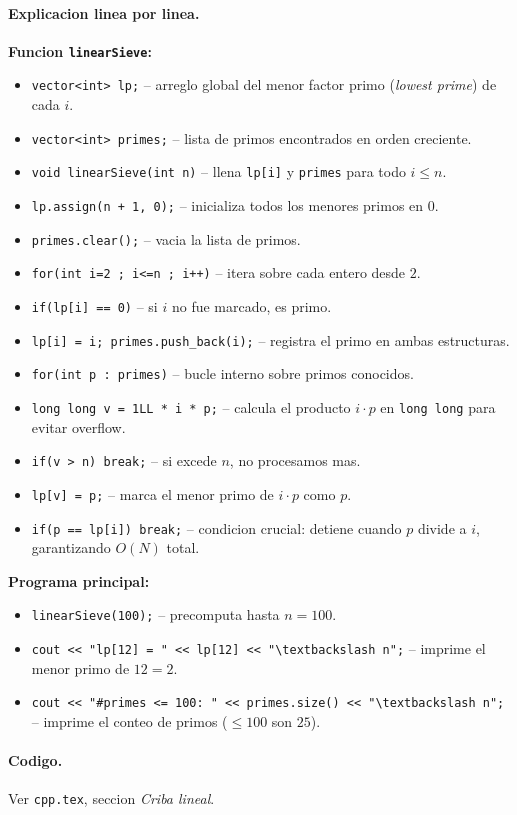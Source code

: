 \paragraph{Explicacion linea por linea.}
\textbf{Funcion \texttt{linearSieve}:}
\begin{itemize}\setlength\itemsep{0pt}
	\item \verb|vector<int> lp;| -- arreglo global del menor factor primo (\textit{lowest prime}) de cada $i$.
	\item \verb|vector<int> primes;| -- lista de primos encontrados en orden creciente.
	\item \verb|void linearSieve(int n)| -- llena \verb|lp[i]| y \texttt{primes} para todo $i \le n$.
	\item \verb|lp.assign(n + 1, 0);| -- inicializa todos los menores primos en $0$.
	\item \verb|primes.clear();| -- vacia la lista de primos.
	\item \verb|for(int i=2 ; i<=n ; i++)| -- itera sobre cada entero desde $2$.
	\item \verb|if(lp[i] == 0)| -- si $i$ no fue marcado, es primo.
	\item \verb|lp[i] = i; primes.push_back(i);| -- registra el primo en ambas estructuras.
	\item \verb|for(int p : primes)| -- bucle interno sobre primos conocidos.
	\item \verb|long long v = 1LL * i * p;| -- calcula el producto $i \cdot p$ en \verb|long long| para evitar overflow.
	\item \verb|if(v > n) break;| -- si excede $n$, no procesamos mas.
	\item \verb|lp[v] = p;| -- marca el menor primo de $i \cdot p$ como $p$.
	\item \verb|if(p == lp[i]) break;| -- condicion crucial: detiene cuando $p$ divide a $i$, garantizando $O(N)$ total.
\end{itemize}
\textbf{Programa principal:}
\begin{itemize}\setlength\itemsep{0pt}
	\item \verb|linearSieve(100);| -- precomputa hasta $n=100$.
	\item \verb|cout << "lp[12] = " << lp[12] << "\textbackslash n";| -- imprime el menor primo de $12 = 2$.
	\item \verb|cout << "#primes <= 100: " << primes.size() << "\textbackslash n";| -- imprime el conteo de primos ($\le 100$ son $25$).
\end{itemize}

\paragraph{Codigo.}
Ver \texttt{cpp.tex}, seccion \textit{Criba lineal}.

\vspace{0.5em|||}
